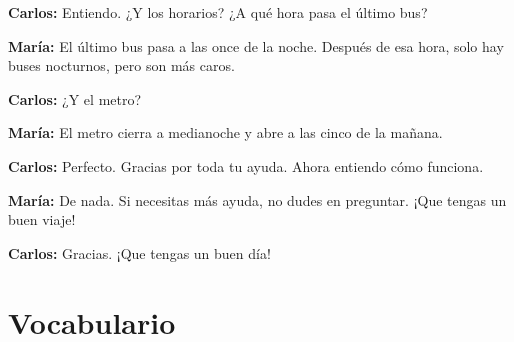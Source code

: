 \documentclass[12pt,a4paper]{article}
\begin{document}
\textbf{Carlos:} Entiendo. ¿Y los horarios? ¿A qué hora pasa el último bus?

\textbf{María:} El último bus pasa a las once de la noche. Después de esa hora, solo hay buses nocturnos, pero son más caros.

\textbf{Carlos:} ¿Y el metro?

\textbf{María:} El metro cierra a medianoche y abre a las cinco de la mañana.

\textbf{Carlos:} Perfecto. Gracias por toda tu ayuda. Ahora entiendo cómo funciona.

\textbf{María:} De nada. Si necesitas más ayuda, no dudes en preguntar. ¡Que tengas un buen viaje!

\textbf{Carlos:} Gracias. ¡Que tengas un buen día!

\newpage

\section*{Vocabulario}
\end{document}
